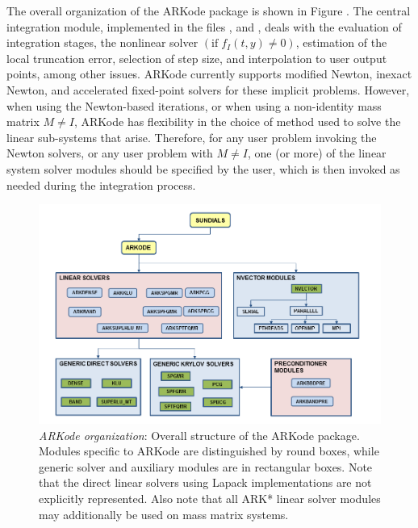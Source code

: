 \documentclass[letterpaper,10pt,english]{sphinxmanual}
\begin{document}
The overall organization of the ARKode package is shown in Figure
{\hyperref[Organization:arkorg]{\emph{}}}.  The central integration module,
implemented in the files ,  and
, deals with the evaluation of integration stages, the
nonlinear solver \((\text{if}\; f_I(t,y)\ne 0)\), estimation of
the local truncation error, selection of step size, and interpolation
to user output points, among other issues.  ARKode currently supports
modified Newton, inexact Newton, and accelerated fixed-point solvers
for these implicit problems.  However, when using the Newton-based
iterations, or when using a non-identity mass matrix \(M\ne I\),
ARKode has flexibility in the choice of method used to solve the
linear sub-systems that arise.  Therefore, for any user problem
invoking the Newton solvers, or any user problem with \(M\ne I\),
one (or more) of the linear system solver modules should be specified
by the user, which is then invoked as needed during the integration
process.
\begin{figure}[htbp]
\centering
\capstart

\includegraphics{arkorg.png}
\caption{\emph{ARKode organization}: Overall structure of the ARKode package.
Modules specific to ARKode are distinguished by round boxes, while
generic solver and auxiliary modules are in rectangular boxes.
Note that the direct linear solvers using Lapack implementations
are not explicitly represented.  Also note that all ARK* linear
solver modules may additionally be used on mass matrix systems.}\label{Organization:arkorg}\end{figure}
\end{document}

